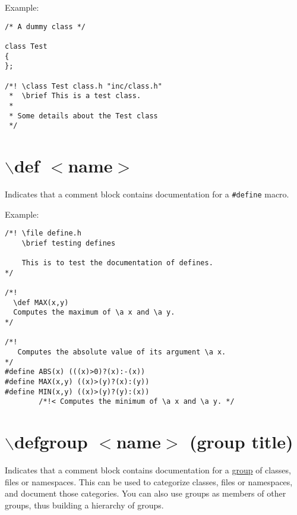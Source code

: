 \begin{Desc}
\item[Example: ]

\begin{VerbInclude}\begin{verbatim}/* A dummy class */

class Test
{
};

/*! \class Test class.h "inc/class.h"
 *  \brief This is a test class.
 *
 * Some details about the Test class
 */
\end{verbatim}
\end{VerbInclude}
 \end{Desc}


 \hypertarget{commands_cmddef}{}\section{$\backslash$def $<$name$>$}\label{commands_cmddef}
 Indicates that a comment block contains documentation for a {\tt \#define} macro.

\begin{Desc}
\item[Example:]

\begin{VerbInclude}\begin{verbatim}/*! \file define.h
    \brief testing defines
    
    This is to test the documentation of defines.
*/

/*!
  \def MAX(x,y)
  Computes the maximum of \a x and \a y.
*/

/*! 
   Computes the absolute value of its argument \a x.
*/
#define ABS(x) (((x)>0)?(x):-(x))
#define MAX(x,y) ((x)>(y)?(x):(y))
#define MIN(x,y) ((x)>(y)?(y):(x)) 
        /*!< Computes the minimum of \a x and \a y. */
\end{verbatim}
\end{VerbInclude}
 \end{Desc}


 \hypertarget{commands_cmddefgroup}{}\section{$\backslash$defgroup $<$name$>$ (group title)}\label{commands_cmddefgroup}
 Indicates that a comment block contains documentation for a \hyperlink{grouping_modules}{group} of classes, files or namespaces. This can be used to categorize classes, files or namespaces, and document those categories. You can also use groups as members of other groups, thus building a hierarchy of groups.

